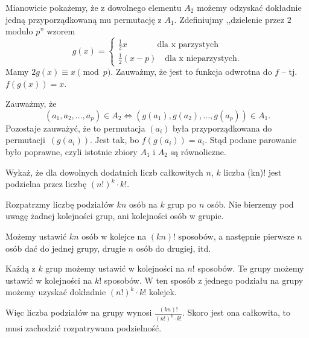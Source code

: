 \noindent
Mianowicie pokażemy, że z dowolnego elementu $A_2$ możemy odzyskać dokładnie jedną przyporządkowaną mu permutację z $A_1$. Zdefiniujmy ,,dzielenie przez $2$ modulo $p$'' wzorem
\[
	g(x) = 
	\begin{cases}
	\frac{1}{2}x \;\; \quad\quad\quad\text{dla x parzystych}\\
	\frac{1}{2}(x - p) \quad \text{dla x nieparzystych}.
	\end{cases}
\]
Mamy $2g(x) \equiv x \pmod{p}$.
Zauważmy, że jest to funkcja odwrotna do $f$ -- tj. $f(g(x)) = x$.
\vspace{10px}

\noindent
Zauważmy, że
\[
	(a_1, a_2, ..., a_p) \in A_2 \iff (g(a_1), g(a_2), ..., g(a_p)) \in A_1.
\] 
Pozostaje zauważyć, że to permutacja $(a_i)$ była przyporządkowana do permutacji~$(g(a_i))$. Jest tak, bo $f(g(a_i)) = a_i$. Stąd podane parowanie było poprawne, czyli istotnie zbiory $A_1$ i $A_2$ są równoliczne.
\vspace{10px}


\vspace{5px}

\begin{problem}{5}
	Wykaż, że dla dowolnych dodatnich liczb całkowitych $n$, $k$ liczba	(kn)!
	jest podzielna przez liczbę $(n!)^k \cdot k!$.
\end{problem}

\vspace{5px}

\noindent
Rozpatrzmy liczbę podziałów $kn$ osób na $k$ grup po $n$ osób. Nie bierzemy pod uwagę żadnej kolejności grup, ani kolejności osób w grupie. 

\vspace{10px}
\noindent
Możemy ustawić $kn$ osób w kolejce na $(kn)!$ sposobów, a następnie pierwsze $n$ osób dać do jednej grupy, drugie $n$ osób do drugiej, itd. 

\vspace{10px}
\noindent
Każdą z $k$ grup możemy ustawić w kolejności na $n!$ sposobów. Te grupy możemy ustawić w kolejności na $k!$ sposobów. W ten sposób z jednego podziału na grupy możemy uzyskać dokładnie $(n!)^k \cdot k!$ kolejek. 

\vspace{10px}
\noindent
Więc liczba podziałów na grupy wynosi $\frac{(kn)!}{(n!)^k \cdot k!}$. Skoro jest ona całkowita, to musi zachodzić rozpatrywana podzielność.

